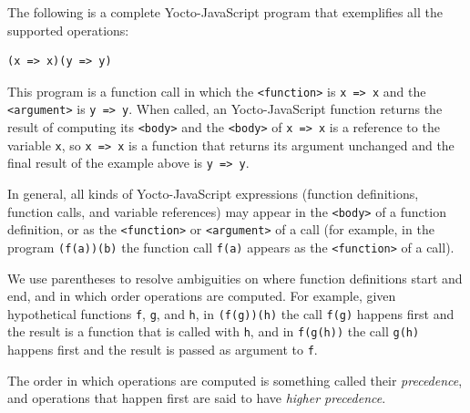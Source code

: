 \documentclass[12pt, oneside]{book}
\begin{document}
The following is a complete Yocto-JavaScript program that exemplifies all the supported operations:

\begin{verbatim}
(x => x)(y => y)
\end{verbatim}

This program is a function call in which the \verb!<function>! is \texttt{x => x} and the \verb!<argument>! is \texttt{y => y}. When called, an Yocto-JavaScript function returns the result of computing its \verb!<body>! and the \verb!<body>! of \texttt{x => x} is a reference to the variable \texttt{x}, so \texttt{x => x} is a function that returns its argument unchanged and the final result of the example above is \texttt{y => y}.

In general, all kinds of Yocto-JavaScript expressions (function definitions, function calls, and variable references) may appear in the \verb!<body>! of a function definition, or as the \verb!<function>! or \verb!<argument>! of a call (for example, in the program \texttt{(f(a))(b)} the function call \texttt{f(a)} appears as the \verb!<function>! of a call).

We use parentheses to resolve ambiguities on where function definitions start and end, and in which order operations are computed. For example, given hypothetical functions \texttt{f}, \texttt{g}, and \texttt{h}, in \texttt{(f(g))(h)} the call \texttt{f(g)} happens first and the result is a function that is called with \texttt{h}, and in \texttt{f(g(h))} the call \texttt{g(h)} happens first and the result is passed as argument to \texttt{f}.

\begin{mdframed}[frametitle = {Technical Terms}]
The order in which operations are computed is something called their \emph{precedence}, and operations that happen first are said to have \emph{higher precedence}.
\end{mdframed}
\end{document}

